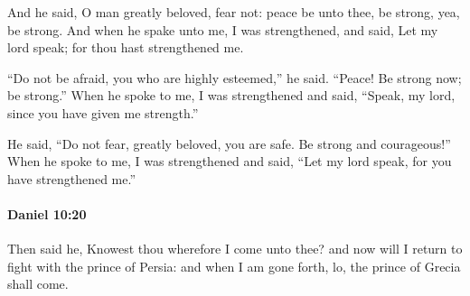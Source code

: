 			\begin{versebox}
					\item[BHS] 
					\item[LXX] 
					\item[ASV] And he said, O man greatly beloved, fear not: peace be unto thee, be strong, yea, be strong. And when he spake unto me, I was strengthened, and said, Let my lord speak; for thou hast strengthened me.
					\item[NIV] “Do not be afraid, you who are highly esteemed,” he said. “Peace! Be strong now; be strong.” When he spoke to me, I was strengthened and said, “Speak, my lord, since you have given me strength.”
					\item[NRSV] He said, “Do not fear, greatly beloved, you are safe. Be strong and courageous!” When he spoke to me, I was strengthened and said, “Let my lord speak, for you have strengthened me.”
			\end{versebox}

		\paragraph{Daniel 10:20} %
			\label{DANIEL-10-20}

			Then said he, Knowest thou wherefore I come unto thee? and now will I return to fight with the prince of Persia: and when I am gone forth, lo, the prince of Grecia shall come.

